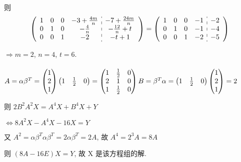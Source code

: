 \begin{enumerate}
			       则 \[ \left(\begin{array}{cccc:c}
						       1 & 0 & 0 & -3+\frac{4m}{n} & -7+\frac{24m}{n} \\
						       0 & 1 & 0 & -\frac{4}{n}    & -\frac{12}{n}+t  \\
						       0 & 0 & 1 & -2              & -t+1
					       \end{array}\right) =
				       \left(\begin{array}{cccc:c}
						       1 & 0 & 0 & -1 & -2 \\
						       0 & 1 & 0 & -1 & -4 \\
						       0 & 0 & 1 & -2 & -5
					       \end{array} \right) \]

			       \( \Rightarrow m = 2 \), \( n = 4 \), \( t = 6 \).
		 \end{enumerate}


	 \paragraph{} %
		 \( A = \alpha\beta^{T} = \begin{pmatrix}
			 1 \\
			 2 \\
			 1
		 \end{pmatrix}\begin{pmatrix}
			 1 & \frac{1}{2} & 0
		 \end{pmatrix} = \begin{pmatrix}
			 1 & \frac{1}{2} & 0 \\
			 2 & 1           & 0 \\
			 1 & \frac{1}{2} & 0
		 \end{pmatrix} \newline B = \beta^{T}\alpha = \begin{pmatrix}
			 1 & \frac{1}{2} & 0
		 \end{pmatrix}\begin{pmatrix}
			 1 \\
			 2 \\
			 1
		 \end{pmatrix} = 2 \)

		 则 \( 2B^{2}A^{2}X = A^{4}X + B^{4}X + Y \)

		 \( \Leftrightarrow 8A^{2}X - A^{4}X - 16X = Y \)

		 又 \( A^{2} = \alpha\beta^{T}\alpha\beta^{T} = 2\alpha\beta^{T} = 2A \), 故 \( A^{4} = 2^{3}A = 8A \)

		 则 \( (8A - 16E)X = Y \), 故 X 是该方程组的解.

